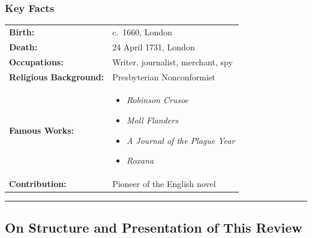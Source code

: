 \documentclass[a4paper]{article}
\begin{document}
\subsubsection*{Key Facts}
\begin{tabular}{l p{10cm}}
\textbf{Birth:} & c.~1660, London \\
\textbf{Death:} & 24 April 1731, London \\
\textbf{Occupations:} & Writer, journalist, merchant, spy \\
\textbf{Religious Background:} & Presbyterian Nonconformist \\
\textbf{Famous Works:} & \begin{itemize}
\item \textit{Robinson Crusoe}
\item \textit{Moll Flanders}
\item \textit{A Journal of the Plague Year}
\item \textit{Roxana} 
\end{itemize}\\
\textbf{Contribution:} & Pioneer of the English novel \\
\end{tabular}

\noindent\rule{\textwidth}{0.4pt}


\subsection{On Structure and Presentation of This Review}
\label{SECSTRUCTURE}
\end{document}
